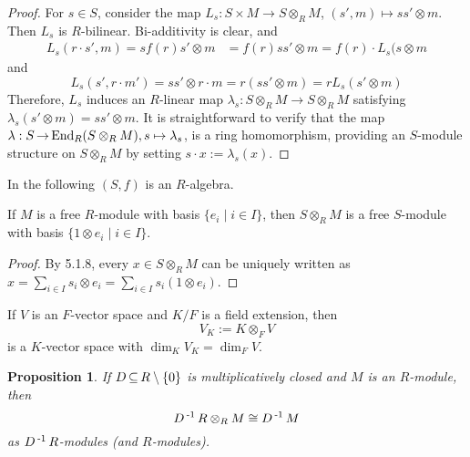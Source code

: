 \documentclass[11pt]{book}
\newcounter{counter}
\newtheorem{proposition}[counter]{Proposition}   \newtheorem{problem}[counter]{Problem}   \newtheorem*{proposition*}{Proposition}   \newtheorem*{lemma*}{Lemma}
\theoremstyle{definition}   \newtheorem{defn}[counter]{Definition} %
\newcommand{\bs}{\setminus}   \newcommand{\A}{\mathcal{A}}   \newcommand{\sy}{\textnormal{Syl}}   \newcommand{\size}[1]{\left| #1 \right|}
\DeclareMathOperator{\ra}{\rightarrow}   \DeclareMathOperator{\Poly}{\mathbf{P}}   \DeclareMathOperator{\spn}{\textnormal{span}}   \DeclareMathOperator{\aut}{\textnormal{Aut}}
\newcommand{\vs}{\vspace{8pt}}   \newcommand{\hs}{\hspace{8pt}}
\numberwithin{counter}{chapter}
\begin{document}
\begin{proof}
For $s \in S$, consider the map $L_s : S \times M \ra S \otimes_R M$, $(s',m) \mapsto ss' \otimes m$. Then $L_s$ is $R$-bilinear. Bi-additivity is clear, and 
\begin{align*}
L_s(r \cdot s',m) = s f(r) s' \otimes m &= f(r) ss' \otimes m = f(r) \cdot L_s(s \otimes m
\end{align*}
and
	\[L_s(s',r \cdot m') = ss' \otimes r \cdot m = r (ss' \otimes m) = r L_s(s' \otimes m) \]
Therefore, $L_s$ induces an $R$-linear map $\lambda_s : S \otimes_R M \ra S \otimes_R M$ satisfying $\lambda_s(s' \otimes m) = ss' \otimes m$. It is straightforward to verify that the map $\lambda : S \ra \tn{End}_R(S \otimes_R M), s \mapsto \lambda_s$, is a ring homomorphism, providing an $S$-module structure on $S \otimes_R M$ by setting $s \cdot x := \lambda_s(x)$. 
\end{proof}

\vs

In the following $(S,f)$ is an $R$-algebra.

\vs

\begin{corollary}
If $M$ is a free $R$-module with basis $\{e_i \mid i \in I\}$, then $S \otimes_R M$ is a free $S$-module with basis $\{1 \otimes e_i \mid i \in I\}$. 
\end{corollary}

\begin{proof}
By 5.1.8, every $x \in S \otimes_R M$ can be uniquely written as $x = \sum_{i \in I} s_i \otimes e_i = \sum_{i \in I} s_i ( 1 \otimes e_i)$. 
\end{proof}

\vs

\begin{example}
If $V$ is an $F$-vector space and $K/F$ is a field extension, then
	\[V_K := K \otimes_F V \]
is a $K$-vector space with $\dim_K V_K = \dim_F V$. 
\end{example}

\vs

\begin{proposition}
If $D \sub R \bs \{0\}$ is multiplicatively closed and $M$ is an $R$-module, then
	\[D\operatorname{^{-1}} R \otimes_R M \cong D\operatorname{^{-1}} M \]
as $D\operatorname{^{-1}} R$-modules (and $R$-modules). 
\end{proposition}
\end{document}
